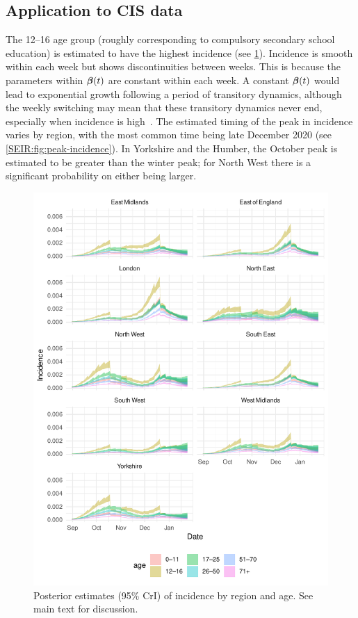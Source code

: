 \documentclass[thesis.tex]{subfiles}
\begin{document}
\subsection{Application to CIS data} \label{SEIR:sec:application}

The 12--16 age group (roughly corresponding to compulsory secondary school education) is estimated to have the highest incidence (see \cref{SEIR:fig:incidence}).
Incidence is smooth within each week but shows discontinuities between weeks.
This is because the parameters within $\bm{\beta}(t)$ are constant within each week.
A constant $\bm{\beta}(t)$ would lead to exponential growth following a period of transitory dynamics, although the weekly switching may mean that these transitory dynamics never end, especially when incidence is high~\autocite{rhodesConvergence}.
The estimated timing of the peak in incidence varies by region, with the most common time being late December 2020 (see \cref{SEIR:fig:peak-incidence}).
In Yorkshire and the Humber, the October peak is estimated to be greater than the winter peak; for North West there is a significant probability on either being larger.
\begin{figure}
    \includegraphics{SEIR/CIS/incidence}
    \caption[Posterior estimates of incidence]{%
        Posterior estimates (95\% CrI) of incidence by region and age.
        See main text for discussion.
    }
    \label{SEIR:fig:incidence}
\end{figure}
\end{document}

